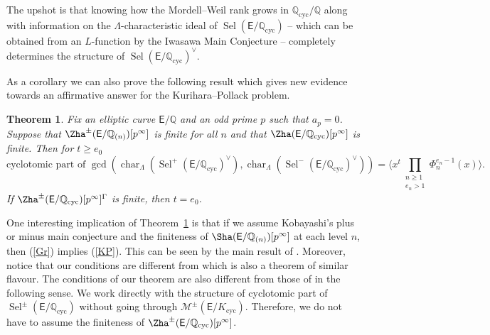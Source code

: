 \documentclass{amsart}
\numberwithin{equation}{section}
\newtheorem{lthm}{Theorem}
\theoremstyle{remark}
\newcommand{\EC}{\mathsf{E}}
\newcommand{\cM}{\mathcal{M}}
\newcommand{\Q}{\mathbb{Q}}
\newcommand{\cyc}{\operatorname{{cyc}}}
\newcommand{\Sel}{\operatorname{Sel}}
\newcommand{\charac}{\operatorname{char}}
\theoremstyle{plain} %
\begin{document}
The upshot is that knowing how the Mordell--Weil rank grows in $\Q_{\cyc}/\Q$ along with information on the $\Lambda$-characteristic ideal of $\Sel(\EC/\Q_{\cyc})$ -- which can be obtained from an $L$-function by the Iwasawa Main Conjecture -- completely determines the structure of $\Sel(\EC/\Q_{\cyc})^\vee$.

As a corollary we can also prove the following result which gives new evidence towards an affirmative answer for the Kurihara--Pollack problem.

\begin{lthm}\label{Theorem D}
Fix an elliptic curve $\EC/\Q$ and an odd prime $p$ such that $a_p =0$.
Suppose that $\Zha^{\pm}(\EC/\Q_{(n)})[p^{\infty}]$ is finite for all $n$ and that $\Zha(\EC/\Q_{\cyc})[p^\infty]$ is finite.
Then for $t\geq e_0$
\[
\text{cyclotomic part of } \gcd\left( \charac_{\Lambda}(\Sel^{+}(\EC/\Q_{\cyc})^\vee), \charac_{\Lambda}(\Sel^{-}(\EC/\Q_{\cyc})^\vee)\right) = \Bigg\langle x^{t} \prod_{\substack{n\geq 1\\e_n>1}} \Phi^{e_n - 1}_n(x) \Bigg\rangle.
\]
If $\Zha^{\pm}(\EC/\Q_{\cyc})[p^\infty]^{\Gamma}$ is finite, then $t=e_0$.
\end{lthm}

One interesting implication of Theorem~\ref{Theorem D} is that if we assume Kobayashi's plus or minus main conjecture and the finiteness of $\Sha(\EC/\Q_{(n)})[p^{\infty}]$ at each level $n$, then (\ref{Gr}) implies (\ref{KP}).
This can be seen by the main result of \cite{Lei-Sujatha-21}.
Moreover, notice that our conditions are different from \cite[Proposition~3.4(2)]{KP07} which is also a theorem of similar flavour.
The conditions of our theorem are also different from those of \cite[Remark~6.10]{Lei23} in the following sense.
We work directly with the structure of cyclotomic part of $\Sel^{\pm}(\EC/\Q_{\cyc})$ without going through $\cM^{\pm}(\EC/K_{\cyc})$.
Therefore, we do not have to assume the finiteness of $\Zha^{\pm}(\EC/\Q_{\cyc})[p^\infty]$.
\end{document}

